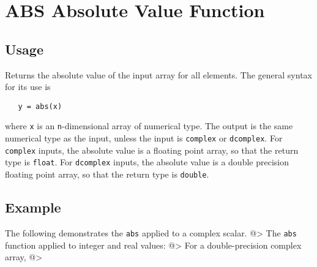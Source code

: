 \section{ABS Absolute Value Function}

\subsection{Usage}

Returns the absolute value of the input array for all elements.  The 
general syntax for its use is
\begin{verbatim}
   y = abs(x)
\end{verbatim}
where \verb|x| is an \verb|n|-dimensional array of numerical type.  The output 
is the same numerical type as the input, unless the input is \verb|complex|
or \verb|dcomplex|.  For \verb|complex| inputs, the absolute value is a floating
point array, so that the return type is \verb|float|.  For \verb|dcomplex|
inputs, the absolute value is a double precision floating point array, so that
the return type is \verb|double|.
\subsection{Example}

The following demonstrates the \verb|abs| applied to a complex scalar.
@>
The \verb|abs| function applied to integer and real values:
@>
For a double-precision complex array,
@>
